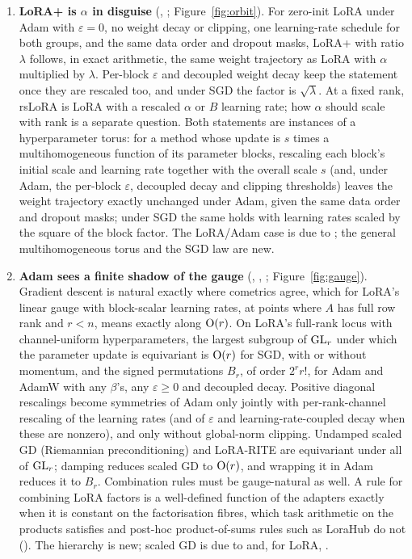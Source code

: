 \begin{enumerate}[label=\textbf{\arabic*.},leftmargin=1.9em]
\item \textbf{LoRA+ is $\alpha$ in disguise} (, ; Figure~\ref{fig:orbit}). For zero-init LoRA under Adam with $\varepsilon=0$, no weight decay or clipping, one learning-rate schedule for both groups, and the same data order and dropout masks, LoRA+ \citep{hayou2024lora} with ratio $\lambda$ follows, in exact arithmetic, the same weight trajectory as LoRA with $\alpha$ multiplied by $\lambda$. Per-block $\varepsilon$ and decoupled weight decay keep the statement once they are rescaled too, and under SGD the factor is $\sqrt\lambda$. At a fixed rank, rsLoRA \citep{kalajdzievski2023rank} is LoRA with a rescaled $\alpha$ or $B$ learning rate; how $\alpha$ should scale with rank is a separate question. Both statements are instances of a hyperparameter torus: for a method whose update is $s$ times a multihomogeneous function of its parameter blocks, rescaling each block's initial scale and learning rate together with the overall scale $s$ (and, under Adam, the per-block $\varepsilon$, decoupled decay and clipping thresholds) leaves the weight trajectory exactly unchanged under Adam, given the same data order and dropout masks; under SGD the same holds with learning rates scaled by the square of the block factor. The LoRA/Adam case is due to \citet{schulman2025lora}; the general multihomogeneous torus and the SGD law are new.

\item \textbf{Adam sees a finite shadow of the gauge} (, , ; Figure~\ref{fig:gauge}). Gradient descent is natural exactly where cometrics agree, which for LoRA's linear gauge with block-scalar learning rates, at points where $A$ has full row rank and $r<n$, means exactly along $\mathrm{O}(r)$. On LoRA's full-rank locus with channel-uniform hyperparameters, the largest subgroup of $\mathrm{GL}_r$ under which the parameter update is equivariant is $\mathrm{O}(r)$ for SGD, with or without momentum, and the signed permutations $B_r$, of order $2^rr!$, for Adam and AdamW with any $\beta$'s, any $\varepsilon\ge0$ and decoupled decay. Positive diagonal rescalings become symmetries of Adam only jointly with per-rank-channel rescaling of the learning rates (and of $\varepsilon$ and learning-rate-coupled decay when these are nonzero), and only without global-norm clipping. Undamped scaled GD (Riemannian preconditioning) and LoRA-RITE \citep{yen2024lora} are equivariant under all of $\mathrm{GL}_r$; damping reduces scaled GD to $\mathrm{O}(r)$, and wrapping it in Adam reduces it to $B_r$. Combination rules must be gauge-natural as well. A rule for combining LoRA factors is a well-defined function of the adapters exactly when it is constant on the factorisation fibres, which task arithmetic on the products satisfies and post-hoc product-of-sums rules such as LoraHub \citep{huang2023lorahub} do not (). The hierarchy is new; scaled GD is due to \citet{xtong2021accelerating} and, for LoRA, \citet{zhang2024riemannian}.


\end{enumerate}
